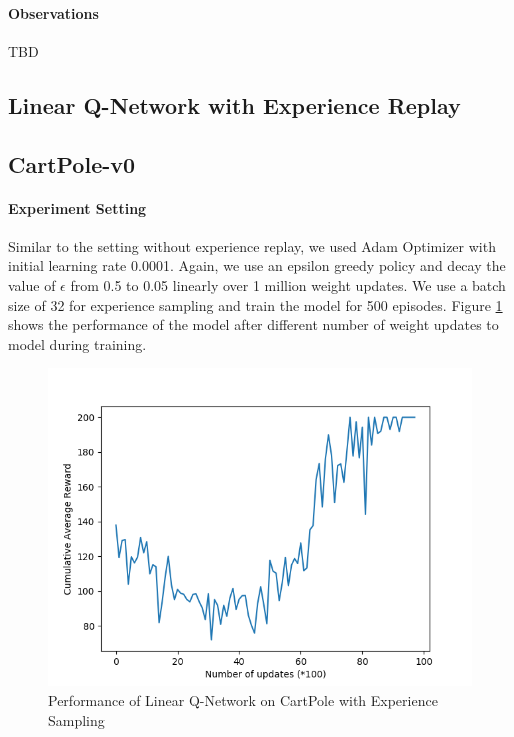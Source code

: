 \documentclass[12pt]{article}
\begin{document}
\paragraph{Observations} TBD

\pagebreak[4]

\subsection{Linear Q-Network with Experience Replay}
\subsection*{CartPole-v0}

\paragraph{Experiment Setting} Similar to the setting without experience replay, we used Adam Optimizer with initial learning rate 0.0001. Again, we use an epsilon greedy policy and decay the value of $\epsilon$ from 0.5 to 0.05 linearly over 1 million weight updates. We use a batch size of 32 for experience sampling and train the model for 500 episodes. Figure \ref{fig:02} shows the performance of the model after different number of weight updates to model during training.
\begin{figure}[h]
  \centering
  \vspace{-5mm}
  \includegraphics[width=0.8\linewidth]{figures/reward_plot_02.png}
  \caption{Performance of Linear Q-Network on CartPole with Experience Sampling}
  \label{fig:02}
\end{figure}
\end{document}
